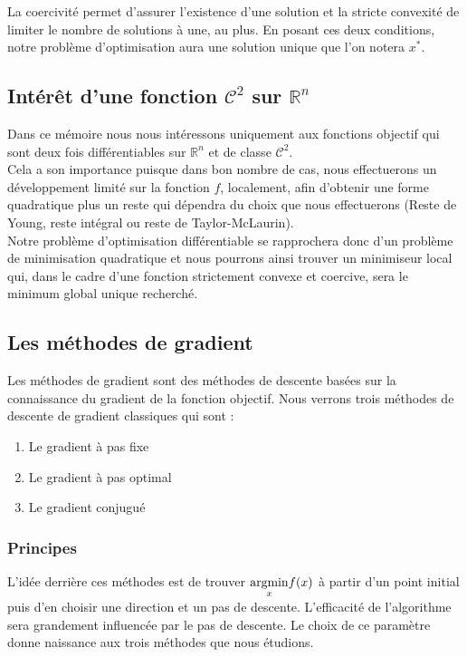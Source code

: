 La coercivité permet d'assurer l'existence d'une solution et la stricte convexité de limiter le nombre de solutions à une, au plus. En posant ces deux conditions, notre problème d'optimisation aura une solution unique que l'on notera $x^*$.

\subsection{Intérêt d'une fonction $\mathcal{C}^2$ sur $\mathbb{R}^n$}
Dans ce mémoire nous nous intéressons uniquement aux fonctions objectif qui sont deux fois différentiables sur $\mathbb{R}^n$ et de classe $\mathcal{C}^2$. \\

Cela a son importance puisque dans bon nombre de cas, nous effectuerons un développement limité sur la fonction $f$, localement, afin d'obtenir une forme quadratique plus un reste qui dépendra du choix que nous effectuerons (Reste de Young, reste intégral ou reste de Taylor-McLaurin). \\

Notre problème d'optimisation différentiable se rapprochera donc d'un problème de minimisation quadratique et nous pourrons ainsi trouver un minimiseur local qui, dans le cadre d'une fonction strictement convexe et coercive, sera le minimum global unique recherché.
\subsection{Les méthodes de gradient}
Les méthodes de gradient sont des méthodes de descente basées sur la connaissance du gradient de la fonction objectif. Nous verrons trois méthodes de descente de gradient classiques qui sont :
\begin{enumerate}
	\item Le gradient à pas fixe
	\item Le gradient à pas optimal
	\item Le gradient conjugué
\end{enumerate}
\subsubsection{Principes}
L'idée derrière ces méthodes est de trouver $\underset{x}{\argmin}f(x)$ à partir d'un point initial puis d'en choisir une direction et un pas de descente. L'efficacité de l'algorithme sera grandement influencée par le pas de descente. Le choix de ce paramètre donne naissance aux trois méthodes que nous étudions.
